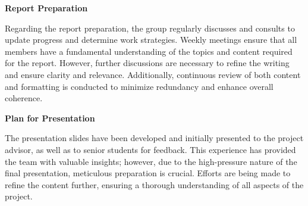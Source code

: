 \textbf{Report Preparation}

Regarding the report preparation, the group regularly 
discusses and consults to update progress and determine 
work strategies. Weekly meetings ensure that all members 
have a fundamental understanding of the topics and 
content required for the report. However, further 
discussions are necessary to refine the writing and 
ensure clarity and relevance. Additionally, continuous 
review of both content and formatting is conducted to 
minimize redundancy and enhance overall coherence.

\textbf{Plan for Presentation}

The presentation slides have been developed and 
initially presented to the project advisor, as well as 
to senior students for feedback. This experience has 
provided the team with valuable insights; however, due 
to the high-pressure nature of the final presentation, 
meticulous preparation is crucial. Efforts are being 
made to refine the content further, ensuring a thorough 
understanding of all aspects of the project. 